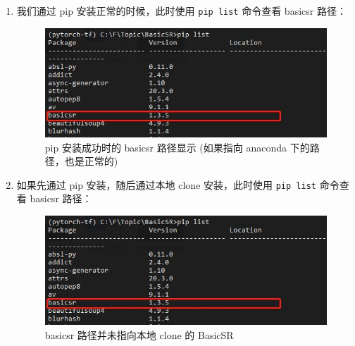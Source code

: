 \documentclass[../main.tex]{subfiles}
\begin{document}
\begin{enumerate}
\begin{enumerate}
    \item 我们通过 pip 安装正常的时候，此时使用 \texttt{pip list} 命令查看 basicsr 路径：
    \begin{figure}[H]
    \begin{center}
        \includegraphics[width=0.7\linewidth]{figures/installation_pip_install_location.jpg}
        \caption{pip 安装成功时的 basicsr 路径显示 (如果指向 anaconda 下的路径，也是正常的)}
        \label{fig:correct-pip-install}
    \end{center}
    \vspace{-0.5cm}
    \end{figure}

    \item 如果先通过 pip 安装，随后通过本地 clone 安装，此时使用 \texttt{pip list} 命令查看 basicsr 路径：
    \begin{figure}[H]
    \begin{center}
        \includegraphics[width=0.7\linewidth]{figures/installation_pip_install_location.jpg}
        \caption{basicsr 路径并未指向本地 clone 的 BasicSR}
        \label{fig:false-clone-install}
    \end{center}
    \vspace{-0.5cm}
    \end{figure}


\end{enumerate}
\end{enumerate}
\end{document}
